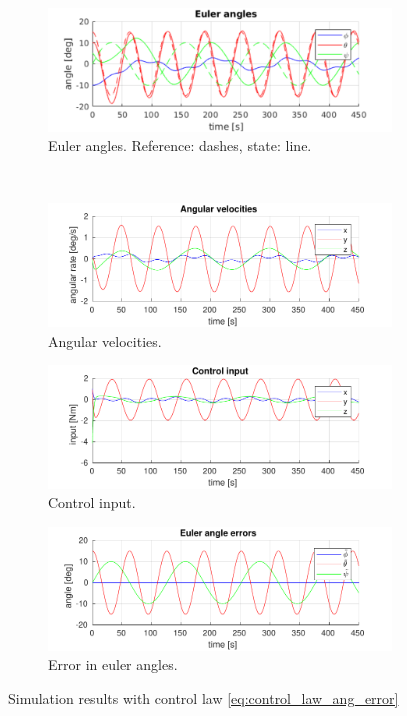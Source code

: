 \begin{figure}[H]
	\centering
	\begin{subfigure}[b]{0.45\textwidth}
		\includegraphics[width=\textwidth]{../matlab/1_6_euler_angles}
		\caption{Euler angles. Reference: dashes, state: line.}
		\label{fig:5a}
	\end{subfigure}
	~ %
	\begin{subfigure}[b]{0.45\textwidth}
		\includegraphics[width=\textwidth]{../matlab/1_6_angular_velocities}
		\caption{Angular velocities.}
		\label{fig:5b}
	\end{subfigure}
	\begin{subfigure}[b]{0.45\textwidth}
		\includegraphics[width=\textwidth]{../matlab/1_6_control_input}
		\caption{Control input.}
		\label{fig:5c}
	\end{subfigure}
	\begin{subfigure}[b]{0.45\textwidth}
		\includegraphics[width=\textwidth]{../matlab/1_6_euler_angle_errors}
		\caption{Error in euler angles.}
		\label{fig:5d}
	\end{subfigure}
	\caption{Simulation results with control law \eqref{eq:control_law_ang_error}}\label{fig:ang_error_control_law}
\end{figure}
